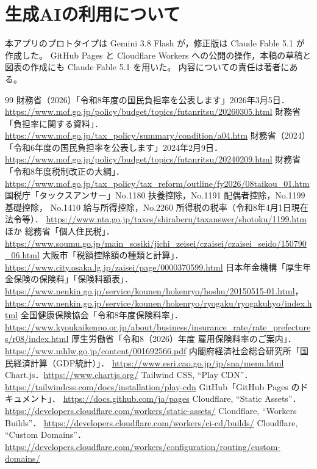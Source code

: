 \documentclass[paper=a4,fontsize=10pt]{jlreq}
\begin{document}
\section*{生成AIの利用について}

本アプリのプロトタイプは Gemini 3.8 Flash が，修正版は Claude Fable 5.1 が作成した。
GitHub Pages と Cloudflare Workers への公開の操作，本稿の草稿と図表の作成にも Claude Fable 5.1 を用いた。
内容についての責任は著者にある。

\begin{thebibliography}{99}
   財務省（2026）「令和8年度の国民負担率を公表します」2026年3月5日．
    \url{https://www.mof.go.jp/policy/budget/topics/futanritsu/20260305.html}
   財務省「負担率に関する資料」．
    \url{https://www.mof.go.jp/tax_policy/summary/condition/a04.htm}
   財務省（2024）「令和6年度の国民負担率を公表します」2024年2月9日．
    \url{https://www.mof.go.jp/policy/budget/topics/futanritsu/20240209.html}
   財務省「令和8年度税制改正の大綱」．
    \url{https://www.mof.go.jp/tax_policy/tax_reform/outline/fy2026/08taikou_01.htm}
   国税庁「タックスアンサー」No.1180 扶養控除，No.1191 配偶者控除，No.1199 基礎控除，
    No.1410 給与所得控除，No.2260 所得税の税率（令和8年4月1日現在法令等）．
    \url{https://www.nta.go.jp/taxes/shiraberu/taxanswer/shotoku/1199.htm} ほか
   総務省「個人住民税」．
    \url{https://www.soumu.go.jp/main_sosiki/jichi_zeisei/czaisei/czaisei_seido/150790_06.html}
   大阪市「税額控除額の種類と計算」．
    \url{https://www.city.osaka.lg.jp/zaisei/page/0000370599.html}
   日本年金機構「厚生年金保険の保険料」「保険料額表」．
    \url{https://www.nenkin.go.jp/service/kounen/hokenryo/hoshu/20150515-01.html}，
    \url{https://www.nenkin.go.jp/service/kounen/hokenryo/ryogaku/ryogakuhyo/index.html}
   全国健康保険協会「令和8年度保険料率」．
    \url{https://www.kyoukaikenpo.or.jp/about/business/insurance_rate/rate_prefectures/r08/index.html}
   厚生労働省「令和8（2026）年度 雇用保険料率のご案内」．
    \url{https://www.mhlw.go.jp/content/001692566.pdf}
   内閣府経済社会総合研究所「国民経済計算（GDP統計）」．
    \url{https://www.esri.cao.go.jp/jp/sna/menu.html}
   Chart.js．\url{https://www.chartjs.org/}
   Tailwind CSS, ``Play CDN''．
    \url{https://tailwindcss.com/docs/installation/play-cdn}
   GitHub「GitHub Pages のドキュメント」．
    \url{https://docs.github.com/ja/pages}
   Cloudflare, ``Static Assets''．
    \url{https://developers.cloudflare.com/workers/static-assets/}
   Cloudflare, ``Workers Builds''．
    \url{https://developers.cloudflare.com/workers/ci-cd/builds/}
   Cloudflare, ``Custom Domains''．
    \url{https://developers.cloudflare.com/workers/configuration/routing/custom-domains/}
\end{thebibliography}
\end{document}
